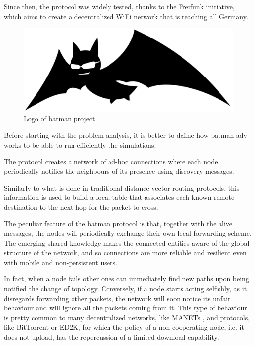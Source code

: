 \documentclass[conference,10.5pt]{IEEEtran}
\begin{document}
Since then, the protocol was widely tested,  thanks to the Freifunk initiative, which aims to create a decentralized WiFi network that is reaching all Germany.

\begin{figure}[h]
  \centering
  \includegraphics[width=0.8\linewidth]{figures/logo.pdf}
  \caption{Logo of \gls{batman} project}
  \label{fig:batman_logo}
\end{figure}

\smallskip

Before starting with the problem analysis, it is better to define how \gls{batman}-adv works to be able to run efficiently the simulations.

The protocol creates a network of ad-hoc connections where each node periodically notifies the neighbours of its presence using discovery messages.

Similarly to what is done in traditional distance-vector routing protocols, this information is used to build a local table that associates each known remote destination to the next hop for the packet to cross.

The peculiar feature of the \gls{batman} protocol is that, together with the alive messages, the nodes will periodically exchange their own local forwarding scheme. The emerging shared knowledge makes the connected entities aware of the global structure of the network, and so connections are more reliable and resilient even with mobile and non-persistent users.

In fact, when a node fails other ones can immediately find new paths upon being notified the change of topology.
Conversely, if a node starts acting selfishly, as it disregards forwarding other packets, the network will soon notice its unfair behaviour and will ignore all the packets coming from it.
This type of behaviour is pretty common to many decentralized networks, like MANETs \cite{MANETs}, and protocols, like BitTorrent or ED2K, for which the policy of a non cooperating node, i.e. it does not upload, has the repercussion of a limited download capability.\cite{BitTorrent,ed2k}
\end{document}
